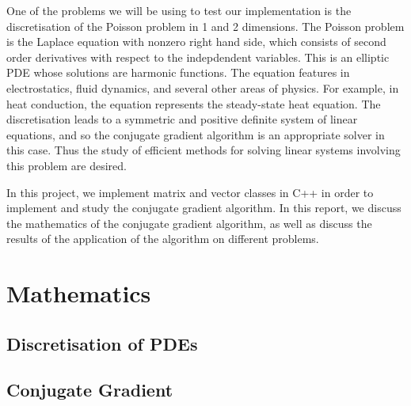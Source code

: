 One of the problems we will be using to test our implementation is the discretisation of the Poisson problem in 1 and 2 dimensions.
The Poisson problem is the Laplace equation with nonzero right hand side, which consists of second order derivatives with respect to the indepdendent variables.
This is an elliptic PDE whose solutions are harmonic functions. 
The equation features in electrostatics, fluid dynamics, and several other areas of physics.
For example, in heat conduction, the equation represents the steady-state heat equation.
The discretisation leads to a symmetric and positive definite system of linear equations, and so the conjugate gradient algorithm is an appropriate solver in this case.
Thus the study of efficient methods for solving linear systems involving this problem are desired.

In this project, we implement matrix and vector classes in C++ in order to implement and study the conjugate gradient algorithm.
In this report, we discuss the mathematics of the conjugate gradient algorithm, as well as discuss the results of the application of the algorithm on different problems.


\section{Mathematics}

\iffalse
CG discussion:

Main algorithm
Mathematics of the mechanism
Preconditioning
Limitations of the algorithm
How do we get good/bad convergence?
Proof of convergence
Proof of complexity
\fi

\subsection{Discretisation of PDEs}



\subsection{Conjugate Gradient}
\label{sec:cg}




